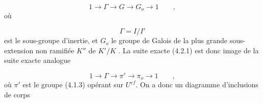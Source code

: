 \begin{equation}\tag{4.2.1}
1 \longrightarrow \Gamma \longrightarrow G \longrightarrow G_o \longrightarrow 1 \qquad ,
\end{equation}
où

\begin{equation}\tag{4.2.2}
\Gamma = I/I'
\end{equation}
est le sous-groupe d'inertie, et $G_o$ le groupe de Galois de la plus grande sous-extension non ramifiée $K''$ de $K'/K$ . La suite exacte (4.2.1) est donc image de la suite exacte analogue

\begin{equation}\tag{4.2.3}
1 \longrightarrow \Gamma \longrightarrow \pi' \longrightarrow \pi_o \longrightarrow 1 \qquad ,
\end{equation}
où $\pi'$ est le groupe (4.1.3) opérant sur $U^{ef}$. On a donc un diagramme d'inclusions de corps

